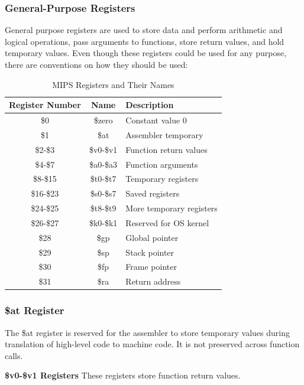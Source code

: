 \subsubsection{General-Purpose Registers}
General purpose registers are used to store data and perform arithmetic and logical operations, pass arguments to functions, store return values, and hold temporary values.
Even though these registers could be used for any purpose, there are conventions on how they should be used:
\begin{table}[h]
    \centering
        \begin{tabular}{|c|c|l|}
        \hline
        \textbf{Register Number} & \textbf{Name} & \textbf{Description} \\ \hline
        \$0 & \$zero & Constant value 0 \\ \hline
        \$1 & \$at & Assembler temporary \\ \hline
        \$2-\$3 & \$v0-\$v1 & Function return values \\ \hline
        \$4-\$7 & \$a0-\$a3 & Function arguments \\ \hline
        \$8-\$15 & \$t0-\$t7 & Temporary registers \\ \hline
        \$16-\$23 & \$s0-\$s7 & Saved registers \\ \hline
        \$24-\$25 & \$t8-\$t9 & More temporary registers \\ \hline
        \$26-\$27 & \$k0-\$k1 & Reserved for OS kernel \\ \hline
        \$28 & \$gp & Global pointer \\ \hline
        \$29 & \$sp & Stack pointer \\ \hline
        \$30 & \$fp & Frame pointer \\ \hline
        \$31 & \$ra & Return address \\ \hline
        \end{tabular}
    \caption{MIPS Registers and Their Names}
    \label{tab:mips_registers}
\end{table}
\subsubsection{\$at Register}
The \$at register is reserved for the assembler to store temporary values during translation of high-level code to machine code. It is not preserved across function calls.

\textbf{\$v0-\$v1 Registers}\newline
These registers store function return values.

